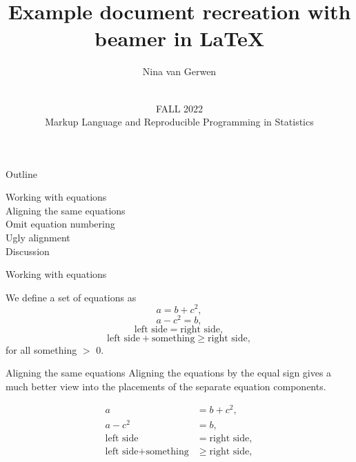 \documentclass[aspectratio=169]{beamer}
\title{Example document recreation with beamer in \LaTeX}
\author{Nina van Gerwen}
\date{\vspace{2cm} \\ FALL 2022 \\
Markup Language and Reproducible Programming in Statistics}
\begin{document}
\maketitle

\begin{frame}{Outline}

Working with equations \\
	\hspace{0.5cm} Aligning the same equations \\
	\hspace{0.5cm} Omit equation numbering \\
	\hspace{0.5cm} Ugly alignment \\
\vspace{1cm}
Discussion
\indent

\end{frame}

\begin{frame}{Working with equations}

We define a set of equations as
	\begin{equation}
		a = b + c^2,
	\end{equation}
	\begin{equation}
		a - c^2 = b,
	\end{equation}
	\begin{equation}
		\text{left side} = \text{right side},
	\end{equation}
	\begin{equation}
		\text{left side} + \text{something} \geq \text{right side},
	\end{equation}
for all something $>$ 0.

\end{frame}

\begin{frame}{Aligning the same equations}
Aligning the equations by the equal sign gives a much better view into the placements of the separate equation components.

	\begin{align}
		a &= b + c^2, \\
		a - c^2 &= b, \\
		\text{left side} &= \text{right side}, \\
		\text{left side} + \text{something} &\geq \text{right side},
	\end{align}

\end{frame}
\end{document}
